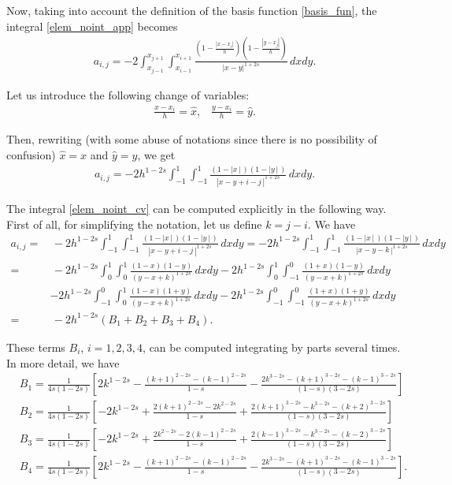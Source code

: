 {Now, taking into account the definition of the basis function \eqref{basis_fun}, the integral \eqref{elem_noint_app} becomes
\begin{align*}
	a_{i,j}=-2 \int_{x_{j-1}}^{x_{j+1}}\int_{x_{i-1}}^{x_{i+1}}\frac{\left(1-\frac{|x-x_i|}{h}\right)\left(1-\frac{|y-x_j|}{h}\right)}{|x-y|^{1+2s}}\,dxdy.
\end{align*}

Let us introduce the following change of variables:
\begin{align*}
	\frac{x-x_i}{h}=\hat{x},\;\;\; \frac{y-x_i}{h}=\hat{y}.
\end{align*}

Then, rewriting (with some abuse of notations since there is no possibility of confusion) $\hat{x}=x$ and $\hat{y}=y$, we get 
\begin{align}\label{elem_noint_cv}
	a_{i,j}=-2h^{1-2s} \int_{-1}^1\int_{-1}^1\frac{(1-|x\,|\,)(1-|y\,|\,)}{|x-y+i-j\,|^{1+2s}}\,dxdy.
\end{align}

The integral \eqref{elem_noint_cv} can be computed explicitly in the following way. First of all, for simplifying the notation, let us define $k=j-i$. We have 
\begin{align*}
	a_{i,j} = &\, -2h^{1-2s} \int_{-1}^1\int_{-1}^1\frac{(1-|x\,|\,)(1-|y\,|\,)}{|x-y+i-j\,|^{1+2s}}\,dxdy =-2h^{1-2s} \int_{-1}^1\int_{-1}^1\frac{(1-|x\,|\,)(1-|y\,|\,)}{|x-y-k\,|^{1+2s}}\,dxdy
	\\
	= &\, -2h^{1-2s} \int_0^1\int_0^1\frac{(1-x)(1-y)}{(y-x+k)^{1+2s}}\,dxdy - 2h^{1-2s} \int_0^1\int_{-1}^0\frac{(1+x)(1-y)}{(y-x+k)^{1+2s}}\,dxdy 
	\\
	&- 2h^{1-2s} \int_{-1}^0\int_0^1\frac{(1-x)(1+y)}{(y-x+k)^{1+2s}}\,dxdy - 2h^{1-2s} \int_{-1}^0\int_{-1}^0\frac{(1+x)(1+y)}{(y-x+k)^{1+2s}}\,dxdy
	\\
	= &\, - 2h^{1-2s}(B_1 + B_2 + B_3 + B_4).
\end{align*}

These terms $B_i$, $i=1,2,3,4$, can be computed integrating by parts several times. In more detail, we have
\begin{align*}
	& B_1 = \frac{1}{4s(1-2s)}\left[2k^{1-2s}-\frac{(k+1)^{2-2s}-(k-1)^{2-2s}}{1-s}-\frac{2k^{3-2s}-(k+1)^{3-2s}-(k-1)^{3-2s}}{(1-s)(3-2s)}\right]
	\\
	& B_2 = \frac{1}{4s(1-2s)}\left[-2k^{1-2s}+\frac{2(k+1)^{2-2s}-2k^{2-2s}}{1-s}+\frac{2(k+1)^{3-2s}-k^{3-2s}-(k+2)^{3-2s}}{(1-s)(3-2s)}\right]
	\\
	& B_3 = \frac{1}{4s(1-2s)}\left[-2k^{1-2s}+\frac{2k^{2-2s}-2(k-1)^{2-2s}}{1-s}+\frac{2(k-1)^{3-2s}-k^{3-2s}-(k-2)^{3-2s}}{(1-s)(3-2s)}\right]
	\\
	& B_4 = \frac{1}{4s(1-2s)}\left[2k^{1-2s}-\frac{(k+1)^{2-2s}-(k-1)^{2-2s}}{1-s}-\frac{2k^{3-2s}-(k+1)^{3-2s}-(k-1)^{3-2s}}{(1-s)(3-2s)}\right].
\end{align*} 

}

